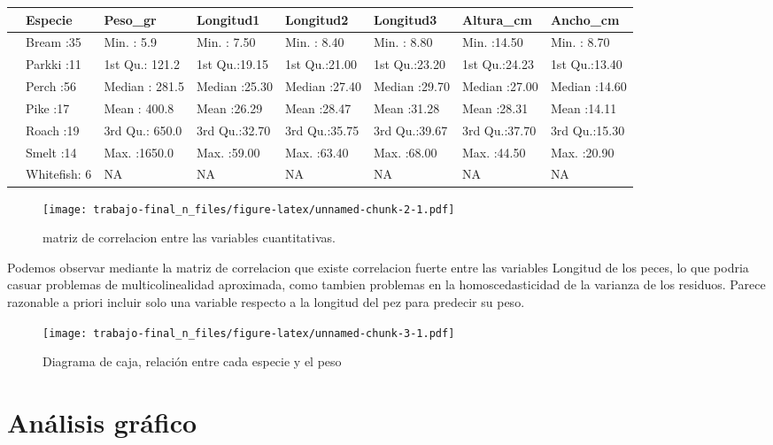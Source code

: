 \documentclass[
]{article}
\begin{document}
\begingroup\fontsize{8}{10}\selectfont

\begin{longtabu} to 
\toprule
 & Especie & Peso\_gr & Longitud1 & Longitud2 & Longitud3 & Altura\_cm & Ancho\_cm\\
\midrule
 & Bream    :35 & Min.   :   5.9 & Min.   : 7.50 & Min.   : 8.40 & Min.   : 8.80 & Min.   :14.50 & Min.   : 8.70\\
 & Parkki   :11 & 1st Qu.: 121.2 & 1st Qu.:19.15 & 1st Qu.:21.00 & 1st Qu.:23.20 & 1st Qu.:24.23 & 1st Qu.:13.40\\
 & Perch    :56 & Median : 281.5 & Median :25.30 & Median :27.40 & Median :29.70 & Median :27.00 & Median :14.60\\
 & Pike     :17 & Mean   : 400.8 & Mean   :26.29 & Mean   :28.47 & Mean   :31.28 & Mean   :28.31 & Mean   :14.11\\
 & Roach    :19 & 3rd Qu.: 650.0 & 3rd Qu.:32.70 & 3rd Qu.:35.75 & 3rd Qu.:39.67 & 3rd Qu.:37.70 & 3rd Qu.:15.30\\
\addlinespace
 & Smelt    :14 & Max.   :1650.0 & Max.   :59.00 & Max.   :63.40 & Max.   :68.00 & Max.   :44.50 & Max.   :20.90\\
 & Whitefish: 6 & NA & NA & NA & NA & NA & NA\\
\bottomrule
\end{longtabu}
\endgroup{}

\begin{figure}
\centering
\texttt{[image: trabajo-final\_n\_files/figure-latex/unnamed-chunk-2-1.pdf]}
\caption{matriz de correlacion entre las variables cuantitativas.}
\end{figure}

Podemos observar mediante la matriz de correlacion que existe
correlacion fuerte entre las variables Longitud de los peces, lo que
podria casuar problemas de multicolinealidad aproximada, como tambien
problemas en la homoscedasticidad de la varianza de los residuos. Parece
razonable a priori incluir solo una variable respecto a la longitud del
pez para predecir su peso.

\begin{figure}
\centering
\texttt{[image: trabajo-final\_n\_files/figure-latex/unnamed-chunk-3-1.pdf]}
\caption{Diagrama de caja, relación entre cada especie y el peso}
\end{figure}

\section{Análisis gráfico}\label{anuxe1lisis-gruxe1fico}
\end{document}

